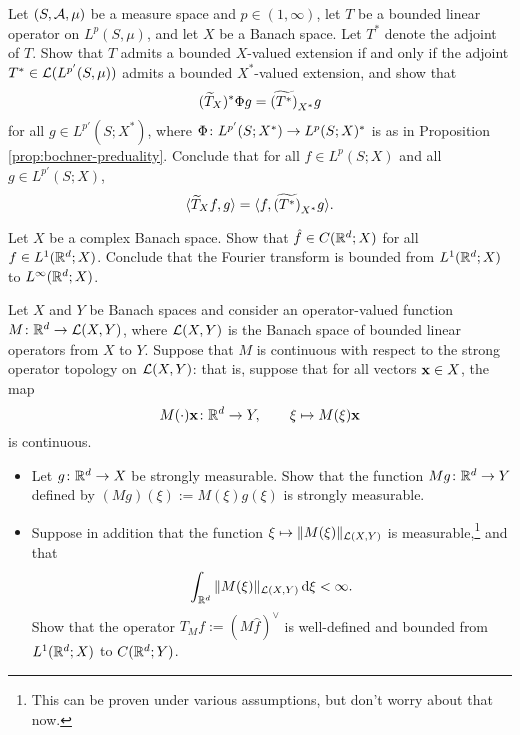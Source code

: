 \begin{exercise}\label{ex:tensor-adjoint}
  Let $(S,\mathcal{A},\mu)$ be a measure space and $p \in (1,\infty)$, let $T$ be a bounded linear operator on $L^p(S,\mu)$, and let $X$ be a Banach space.
  Let $T^*$ denote the adjoint of $T$.
  Show that $T$ admits a bounded $X$-valued extension if and only if the adjoint $T^* \in \mathcal{L}(L^{p'}(S,\mu))$ admits a bounded $X^*$-valued extension, and show that
  \begin{equation*}
    (\widetilde{T}_X)^* \Phi g = \widetilde{(T^*)}_{X^*} g
  \end{equation*}
  for all $g \in L^{p'}(S;X^*)$, where $\Phi \colon L^{p'}(S;X^*) \rightarrow L^p(S;X)^*$ is as in Proposition \ref{prop:bochner-preduality}.
  Conclude that for all $f \in L^p(S;X)$ and all $g \in L^{p'}(S;X)$,
  \begin{equation}\label{eq:tensor-adjoint-identity}
    \langle \widetilde{T}_X f, g \rangle = \langle f, \widetilde{(T^*)}_{X^*} g \rangle.
  \end{equation}
\end{exercise}

\begin{exercise}\label{ex:FT-bounded-1-infty}
  Let $X$ be a complex Banach space.
  Show that $\hat{f} \in C(\mathbb{R}^d;X)$ for all $f \in L^1(\mathbb{R}^d;X)$.
  Conclude that the Fourier transform is bounded from $L^1(\mathbb{R}^d;X)$ to $L^\infty(\mathbb{R}^d;X)$.
\end{exercise}

\begin{exercise}
  Let $X$ and $Y$ be Banach spaces and consider an operator-valued function $M \colon \mathbb{R}^d \rightarrow \mathcal{L}(X,Y)$, where $\mathcal{L}(X,Y)$ is the Banach space of bounded linear operators from $X$ to $Y$.
  Suppose that $M$ is continuous with respect to the strong operator topology on $\mathcal{L}(X,Y)$: that is, suppose that for all vectors $\mathbf{x} \in X$, the map
  \begin{equation*}
    M(\cdot)\mathbf{x} \colon \mathbb{R}^d \rightarrow Y, \qquad \xi \mapsto M(\xi)\mathbf{x}
  \end{equation*}
  is continuous.
  \begin{itemize}
  \item
    Let $g \colon \mathbb{R}^d \rightarrow X$ be strongly measurable.
    Show that the function $Mg \colon \mathbb{R}^d \rightarrow Y$ defined by $(Mg)(\xi) := M(\xi)g(\xi)$ is strongly measurable.
  \item
    Suppose in addition that the function $\xi \mapsto \|M(\xi)\|_{\mathcal{L}(X,Y)}$ is measurable,\footnote{This can be proven under various assumptions, but don't worry about that now.} and that
    \begin{equation*}
      \int_{\mathbb{R}^d} \|M(\xi)\|_{\mathcal{L}(X,Y)} \, \mathrm{d} \xi < \infty.
    \end{equation*}
    Show that the operator $T_Mf := (M\hat{f})^\vee$ is well-defined and bounded from $L^1(\mathbb{R}^d;X)$ to $C(\mathbb{R}^d;Y)$.
  \end{itemize}
\end{exercise}

